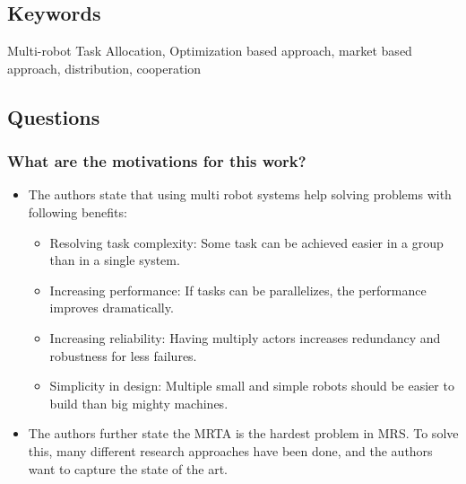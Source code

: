 \subsection*{Keywords}
Multi-robot Task Allocation, Optimization based approach, market based approach, distribution, cooperation

\subsection*{Questions}
\subsubsection*{What are the motivations for this work?}
\begin{itemize}
    \item The authors state that using multi robot systems help solving problems with following benefits: \ \begin{itemize}
        \item Resolving task complexity: Some task can be achieved easier in a group than in a single system.
        \item Increasing performance: If tasks can be parallelizes, the performance improves dramatically.
        \item Increasing reliability: Having multiply actors increases redundancy and robustness for less failures.
        \item Simplicity in design: Multiple small and simple robots should be easier to build than big mighty machines.
    \end{itemize}
    \item The authors further state the MRTA is the hardest problem in MRS. To solve this, many different research approaches have been done, and the authors want to capture the state of the art.
\end{itemize}

